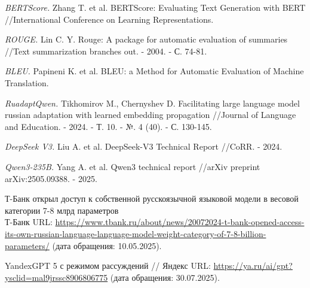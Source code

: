 \documentclass{article}
\begin{document}
\begin{thebibliography}{99}
\textit{BERTScore.}
Zhang T. et al. BERTScore: Evaluating Text Generation with BERT //International Conference on Learning Representations.

\textit{ROUGE.}
Lin C. Y. Rouge: A package for automatic evaluation of summaries //Text summarization branches out. - 2004. - С. 74-81.

\textit{BLEU.}
Papineni K. et al. BLEU: a Method for Automatic Evaluation of Machine Translation.

\textit{RuadaptQwen.}
Tikhomirov M., Chernyshev D. Facilitating large language model russian adaptation with learned embedding propagation //Journal of Language and Education. - 2024. - Т. 10. - №. 4 (40). - С. 130-145.

\textit{DeepSeek V3.}
Liu A. et al. DeepSeek-V3 Technical Report //CoRR. - 2024.

\textit{Qwen3-235B.}
Yang A. et al. Qwen3 technical report //arXiv preprint arXiv:2505.09388. - 2025.

Т-Банк открыл доступ к собственной русскоязычной языковой модели в весовой категории 7-8 млрд параметров\\ Т-Банк URL: \url{https://www.tbank.ru/about/news/20072024-t-bank-opened-access-its-own-russian-language-language-model-weight-category-of-7-8-billion-parameters/} (дата обращения: 10.05.2025).

YandexGPT 5 с режимом рассуждений // Яндекс URL: \url{https://ya.ru/ai/gpt?ysclid=mal9jrssc8906806775} (дата обращения: 30.07.2025).

\end{thebibliography}
\end{document}
